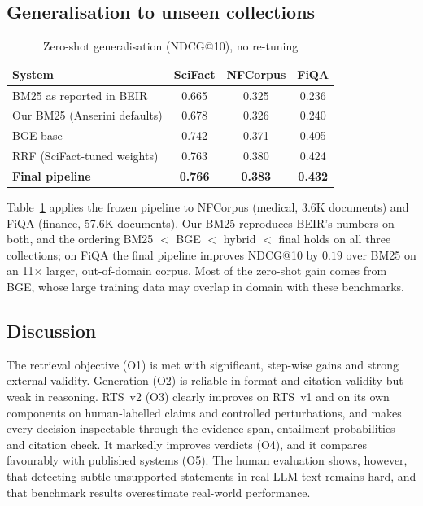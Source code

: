 \documentclass[conference]{IEEEtran}
\newcommand{\best}[1]{\textbf{#1}}
\begin{document}
\subsection{Generalisation to unseen collections}
\begin{table}[t]
\centering
\caption{Zero-shot generalisation (NDCG@10), no re-tuning}
\label{tab:gen2}
\footnotesize
\setlength{\tabcolsep}{3pt}
\begin{tabular}{@{}lccc@{}}
\toprule
System & SciFact & NFCorpus & FiQA \\
\midrule
BM25 as reported in BEIR \cite{thakur2021beir} & 0.665 & 0.325 & 0.236 \\
Our BM25 (Anserini defaults) & 0.678 & 0.326 & 0.240 \\
BGE-base & 0.742 & 0.371 & 0.405 \\
RRF (SciFact-tuned weights) & 0.763 & 0.380 & 0.424 \\
\textbf{Final pipeline} & \best{0.766} & \best{0.383} & \best{0.432} \\
\bottomrule
\end{tabular}
\end{table}
Table~\ref{tab:gen2} applies the frozen pipeline to NFCorpus (medical, 3.6K documents) and FiQA (finance, 57.6K documents).
Our BM25 reproduces BEIR's numbers on both, and the ordering BM25 $<$ BGE $<$ hybrid $<$ final holds on all three
collections; on FiQA the final pipeline improves NDCG@10 by $0.19$ over BM25 on an 11$\times$ larger, out-of-domain
corpus. Most of the zero-shot gain comes from BGE, whose large training data may overlap in domain with these benchmarks.

\subsection{Discussion}
The retrieval objective (O1) is met with significant, step-wise gains and strong external validity. Generation (O2) is
reliable in format and citation validity but weak in reasoning. RTS~v2 (O3) clearly improves on RTS~v1 and on its own
components on human-labelled claims and controlled perturbations, and makes every decision inspectable through the evidence
span, entailment probabilities and citation check. It markedly improves verdicts (O4), and it compares favourably with
published systems (O5). The human evaluation shows, however, that detecting subtle unsupported statements in real LLM text
remains hard, and that benchmark results overestimate real-world performance.

\end{document}
